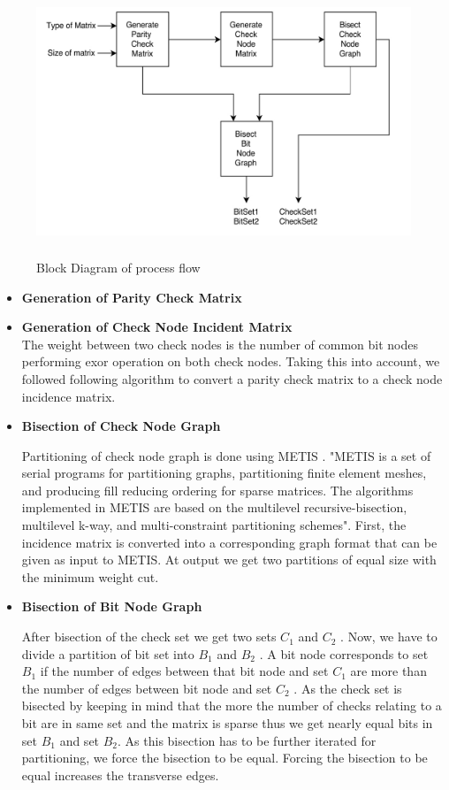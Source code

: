  \begin{figure}[h]
 \begin{center}
    \includegraphics[height=8cm,width=14cm]{partition2.jpg}
    \caption{Block Diagram of process flow} 
    \label{partition2}
 \end{center}
\end{figure}  

\begin{itemize}
\item \textbf{Generation of Parity Check Matrix}
\item \textbf{Generation of Check Node Incident Matrix} \\
The weight between two check nodes is the number of common bit nodes performing exor operation on both check nodes.
Taking this into account, we followed following algorithm to
convert a parity check matrix to a check node incidence matrix.

\item \textbf{Bisection of Check Node Graph}

Partitioning of check node graph is done using METIS \cite{6}.
"METIS is a set of serial programs for partitioning graphs,
partitioning finite element meshes, and producing fill reducing
ordering for sparse matrices. The algorithms implemented in
METIS are based on the multilevel recursive-bisection, multilevel k-way, and multi-constraint partitioning schemes"\cite{6}.
First, the incidence matrix is converted into a corresponding
graph format that can be given as input to METIS. At output
we get two partitions of equal size with the minimum weight
cut.

\item \textbf{Bisection of Bit Node Graph}

After bisection of the check set we get two sets $C_{1}$ and $C_{2}$ .
Now, we have to divide a partition of bit set into $B_{1}$ and $B_{2}$ . A
bit node corresponds to set $ B_{1}$ if the number of edges between
that bit node and set $C_{1}$ are more than the number of edges
between bit node and set $ C_{2}$ . As the check set is bisected by
keeping in mind that the more the number of checks relating
to a bit are in same set and the matrix is sparse thus we get
nearly equal bits in set $B_{1}$ and set $B_{2}$. As this bisection has
to be further iterated for partitioning, we force the bisection
to be equal. Forcing the bisection to be equal increases the
transverse edges.


\end{itemize}

